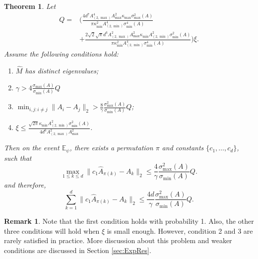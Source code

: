 \documentclass[twoside]{article}
\newcommand{\Epsi}{\mathbb{E}_{\psi}}
\newtheorem{thm}[lemma]{Theorem}
\theoremstyle{definition}
\newtheorem{remark}[lemma]{Remark}
\begin{document}
 \begin{thm}
 \label{thm:efficiency}
Let 
 \begin{align}
 Q = &\Big(\frac{4d^7A_{(2,\max)}^4A_{\max}^2\kappa_{\max}\sigma_{\max}^2(A) }{\pi\kappa^2_{\min}A^4_{(2,\min)}\sigma_{\min}^4(A)} \\
 & + \frac{2\sqrt{2}\sqrt{\pi}d^6A_{(2,\max)}^2A_{\max}^2\kappa_{\min}A^2_{(2,\min)}\sigma_{\min}^2(A)}{\pi\kappa^2_{\min}A^4_{(2,\min)}\sigma_{\min}^4(A)} \Big)
  \xi.
 \end{align}
 Assume the following conditions hold:
 \begin{enumerate}
 \item $\widehat{M}$ has distinct eigenvalues;
 \item $\gamma > 4\frac{\sigma_{\max}(A)}{\sigma_{\min}(A)} Q$
 \item $\min_{i,j:i\neq j} \|A_i - A_j\|_2 > \frac{8}{\gamma}\frac{\sigma_{\max}^2(A)}{\sigma_{\min}(A) } Q$;
 \item $\xi \le \frac{\sqrt{2\pi}\kappa_{\min}A^2_{(2,\min)}\sigma_{\min}^2(A)}{4d^6 A_{(2,\max)}^2A_{\max}^2}$.
  \end{enumerate}
 Then on the event $\Epsi$, there exists a permutation $\pi$ and constants $\{c_1,\ldots,c_d\}$, such that
 \[
  \max_{1\le k\le d}\| c_1\widehat{A}_{\pi(k)} - A_k\|_2 \le \frac{4}{\gamma} \frac{\sigma_{\max}^2(A)}{ \sigma_{\min}(A)}Q .
  \]
  and therefore,
 \[
 \sum_{k=1}^{d}\| c_1\widehat{A}_{\pi(k)} - A_k\|_2 \le \frac{4d}{\gamma} \frac{\sigma_{\max}^2(A)}{ \sigma_{\min}(A)}Q .
 \]
 \end{thm}
\begin{remark}
Note that the first condition holds with probability 1. Also, the other three conditions will hold when $\xi$ is small enough. However, condition 2 and 3 are rarely satisfied in practice. 
More discussion about this problem and weaker conditions are discussed in Section \ref{sec:ExpRes}. 
\end{remark}
\end{document}
